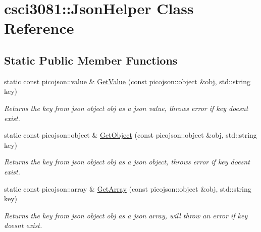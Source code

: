 \hypertarget{classcsci3081_1_1JsonHelper}{}\section{csci3081\+:\+:Json\+Helper Class Reference}
\label{classcsci3081_1_1JsonHelper}
\subsection*{Static Public Member Functions}
\begin{DoxyCompactItemize}
\item 
static const picojson\+::value \& \hyperlink{classcsci3081_1_1JsonHelper_a5c690dab7594cc0a33e6c17cf7afc708}{Get\+Value} (const picojson\+::object \&obj, std\+::string key)
\begin{DoxyCompactList}\small\item\em Returns the key from json object obj as a json value, throws error if key doesn\textquotesingle{}t exist. \end{DoxyCompactList}\item 
\mbox{\label{classcsci3081_1_1JsonHelper_ae11653e9550cf64a42e531aa03593307}} 
static const picojson\+::object \& \hyperlink{classcsci3081_1_1JsonHelper_ae11653e9550cf64a42e531aa03593307}{Get\+Object} (const picojson\+::object \&obj, std\+::string key)
\begin{DoxyCompactList}\small\item\em Returns the key from json object obj as a json object, throws error if key doesn\textquotesingle{}t exist. \end{DoxyCompactList}\item 
\mbox{\label{classcsci3081_1_1JsonHelper_afd99b2ed07c187ca1fa2f95adc5d1346}} 
static const picojson\+::array \& \hyperlink{classcsci3081_1_1JsonHelper_afd99b2ed07c187ca1fa2f95adc5d1346}{Get\+Array} (const picojson\+::object \&obj, std\+::string key)
\begin{DoxyCompactList}\small\item\em Returns the key from json object obj as a json array, will throw an error if key doesn\textquotesingle{}t exist. \end{DoxyCompactList}\item 
\mbox{\label{classcsci3081_1_1JsonHelper_af50a46a1f75f23c755e45b8477f69133}} 

\end{DoxyCompactItemize}
